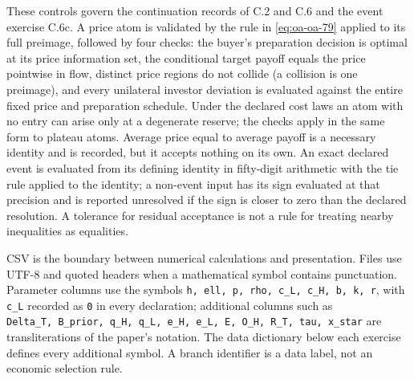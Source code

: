 \begin{Shaded}
\begin{Highlighting}[]
\end{Highlighting}
\end{Shaded}

These controls govern the continuation records of C.2 and C.6 and the
event exercise C.6c. A price atom is validated by the
rule in \eqref{eq:oa-oa-79} applied to its full preimage, followed by
four checks: the buyer's preparation decision is optimal at
its price information set, the conditional target payoff equals the
price pointwise in flow, distinct price regions do not
collide (a collision is one preimage), and every unilateral investor
deviation is evaluated against the entire fixed price and preparation
schedule. Under the declared cost laws an atom with no entry can arise only
at a degenerate reserve; the checks apply in the same form to plateau atoms.
Average price equal to average payoff is a necessary identity
and is recorded, but it accepts nothing on its own. An exact declared
event is evaluated from its defining identity in fifty-digit arithmetic
with the tie rule applied to the identity; a non-event input has its
sign evaluated at that precision and is reported unresolved if the sign
is closer to zero than the declared resolution. A tolerance for residual
acceptance is not a rule for treating nearby inequalities as equalities.

CSV is the boundary between numerical calculations and presentation.
Files use UTF-8 and quoted headers when a mathematical symbol contains
punctuation. Parameter columns use the symbols
\texttt{h,\ ell,\ p,\ rho,\ c\_L,\ c\_H,\ b,\ k,\ r}, with \texttt{c\_L}
recorded as \texttt{0} in every declaration; additional columns
such as
\texttt{Delta\_T,\ B\_prior,\ q\_H,\ q\_L,\ e\_H,\ e\_L,\ E,\ O\_H,\ R\_T,\ tau,\ x\_star}
are transliterations of the paper's notation. The data dictionary below
each exercise defines every additional symbol. A branch identifier is a
data label, not an economic selection rule.
